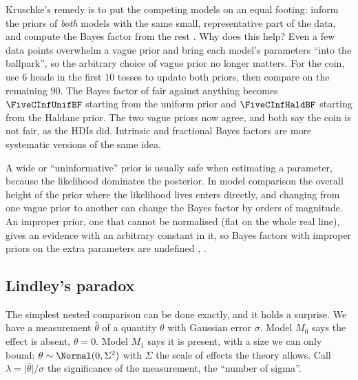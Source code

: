 Kruschke's remedy is to put the competing models on an equal footing: inform the priors
of \emph{both} models with the same small, representative part of the data, and compute
the Bayes factor from the rest . Why does this help? Even a
few data points overwhelm a vague prior and bring each model's parameters ``into the
ballpark'', so the arbitrary choice of vague prior no longer matters. For the
coin, use $6$ heads in the first $10$ tosses to update both priors, then compare on the
remaining $90$. The Bayes factor of fair against anything becomes $\FiveCInfUnifBF$ starting
from the uniform prior and $\FiveCInfHaldBF$ starting from the Haldane prior. The two vague
priors now agree, and both say the coin is not fair, as the HDIs did. Intrinsic and
fractional Bayes factors are more systematic versions of the same idea.

\begin{pitfall}
A wide or ``uninformative'' prior is usually safe when estimating a parameter,
because the likelihood dominates the posterior. In model comparison the overall height
of the prior where the likelihood lives enters directly, and changing from one vague
prior to another can change the Bayes factor by orders of magnitude. An improper prior,
one that cannot be normalised (flat on the whole real line), gives an evidence with an
arbitrary constant in it, so Bayes factors with improper priors on the extra parameters
are undefined , .
\end{pitfall}

\subsection{Lindley's paradox}
\label{5c:sec:lindley}

The simplest nested comparison can be done exactly, and it holds a surprise. We have a
measurement $\hat\theta$ of a quantity $\theta$ with Gaussian error $\sigma$. Model
$M_0$ says the effect is absent, $\theta=0$. Model $M_1$ says it is present, with a
size we can only bound: $\theta\sim\Normal(0,\Sigma^2)$ with $\Sigma$ the scale of
effects the theory allows. Call $\lambda=\lvert\hat\theta\rvert/\sigma$ the
significance of the measurement, the ``number of sigma''.

